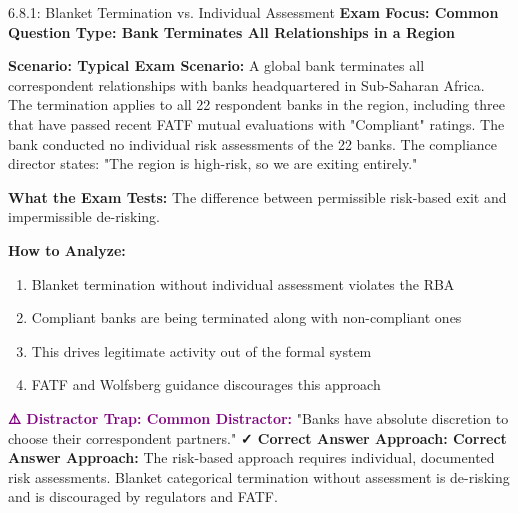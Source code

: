 \documentclass[11pt,a4paper]{beamer}
\newcommand{\examfocus}[1]{\textcolor{orange!80!black}{\textbf{Exam Focus: #1}}}
\newcommand{\trap}[1]{\textcolor{purple}{\textbf{⚠️ Distractor Trap: #1}}}
\newcommand{\correct}[1]{\textcolor{green!50!black}{\textbf{✓ Correct Answer Approach: #1}}}
\newcommand{\scenario}[1]{\textcolor{blue!70!black}{\textbf{Scenario: #1}}}
\begin{document}
	\begin{frame}{6.8.1: Blanket Termination vs. Individual Assessment}
		\examfocus{Common Question Type: Bank Terminates All Relationships in a Region}
		
		\scenario{Typical Exam Scenario:}
		A global bank terminates all correspondent relationships with banks headquartered in Sub-Saharan Africa. The termination applies to all 22 respondent banks in the region, including three that have passed recent FATF mutual evaluations with "Compliant" ratings. The bank conducted no individual risk assessments of the 22 banks. The compliance director states: "The region is high-risk, so we are exiting entirely."
		
		\textbf{What the Exam Tests:} The difference between permissible risk-based exit and impermissible de-risking.
		
		\textbf{How to Analyze:}
		\begin{enumerate}
			\item Blanket termination without individual assessment violates the RBA
			\item Compliant banks are being terminated along with non-compliant ones
			\item This drives legitimate activity out of the formal system
			\item FATF and Wolfsberg guidance discourages this approach
		\end{enumerate}
		
		\trap{Common Distractor:} "Banks have absolute discretion to choose their correspondent partners."
		\correct{Correct Answer Approach:} The risk-based approach requires individual, documented risk assessments. Blanket categorical termination without assessment is de-risking and is discouraged by regulators and FATF.
	\end{frame}
	
\end{document}

